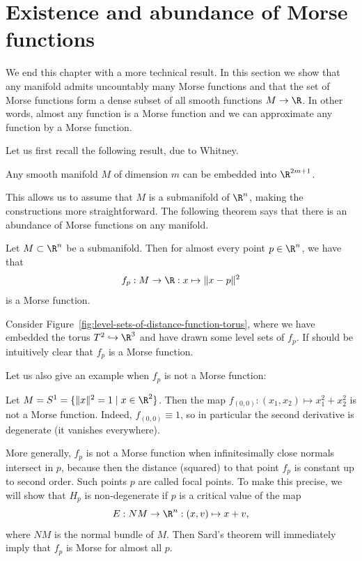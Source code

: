 \section{Existence and abundance of Morse functions}
We end this chapter with a more technical result.
In this section we show that any manifold admits uncountably many Morse functions and that the set of Morse functions form a dense subset of all smooth functions $M \to  \R$.
In other words, almost any function is a Morse function and we can approximate any function by a Morse function.

Let us first recall the following result, due to Whitney.
\begin{theorem}
    Any smooth manifold $M$ of dimension $m$ can be embedded into  $\R^{2m+1}$.
\end{theorem}
This allows us to assume that $M$ is a submanifold of $\R^{n}$, making the constructions  more straightforward.
The following theorem says that there is an abundance of Morse functions on any manifold.
\begin{prop}
    Let $M \subset \R^{n}$ be a submanifold.
    Then for almost every point $p \in \R^{n}$, we have that
    \[
    f_p : M \to \R: x \mapsto  \|x - p\|^2
    \] 
    is a Morse function.
\end{prop}
\begin{marginfigure}[-4cm]
    \centering
    \caption{An embedding of the torus $T^2$ in $\R^3$. The level sets of $f_p$ are spheres. We see that $f_p$ has four critical points: a maximum, a minimum and two saddle points.}
    \label{fig:level-sets-of-distance-function-torus}
\end{marginfigure}
\begin{eg}
    Consider Figure~\ref{fig:level-sets-of-distance-function-torus}, where we have embedded the torus $T^{2} \hookrightarrow \R^3$ and have drawn some level sets of $f_p$.
    If should be intuitively clear that  $f_p$ is a Morse function.
\end{eg}
Let us also give an example when $f_p$ is not a Morse function:
\begin{noneg}
    Let $M = S^1 = \{\|x\|^2 = 1  \mid  x \in \R^2\} $.
    Then the map $f_{(0, 0)}:(x_1,x_2)\mapsto x_1^2 + x_2^2$ is not a Morse function.
    Indeed, $f_{(0, 0)} \equiv 1$, so in particular the second derivative is degenerate (it vanishes everywhere).
\end{noneg}


More generally, $f_p$ is not a Morse function when infinitesimally close normals intersect in $p$, because then the distance (squared) to that point $f_p$ is constant up to second order.
Such points $p$ are called focal points.
To make this precise, we will show that $H_p$ is non-degenerate if $p$ is a critical value of the map
\[
    E: NM \to  \R^{n}: (x, v) \mapsto x + v
,\]
where $NM$ is the normal bundle of $M$.
Then Sard's theorem will immediately imply that $f_p$ is Morse for almost all $p$.


